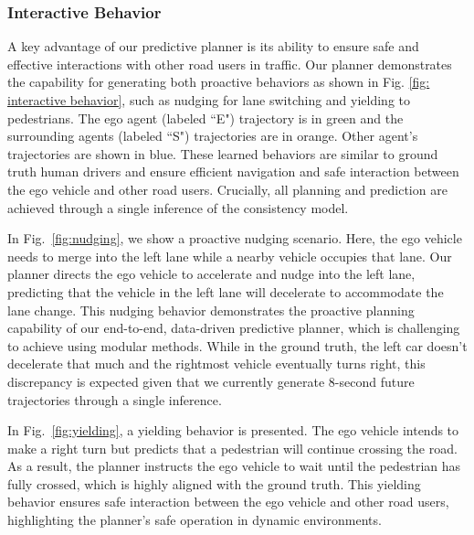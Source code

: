 \subsubsection{\textbf{Interactive Behavior}}

A key advantage of our predictive planner is its ability to ensure safe and effective interactions with other road users in traffic.
Our planner demonstrates the capability for generating both proactive behaviors as shown in Fig. \ref{fig: interactive behavior}, such as nudging for lane switching and yielding to pedestrians.
The ego agent (labeled ``E") trajectory is in green and the surrounding agents (labeled ``S") trajectories are in orange.
Other agent's trajectories are shown in blue.
These learned behaviors are similar to ground truth human drivers and ensure efficient navigation and safe interaction between the ego vehicle and other road users.
Crucially, all planning and prediction are achieved through a single inference of the consistency model.

In Fig.~\ref{fig:nudging}, we show a proactive nudging scenario. 
Here, the ego vehicle needs to merge into the left lane while a nearby vehicle occupies that lane. 
Our planner directs the ego vehicle to accelerate and nudge into the left lane, predicting that the vehicle in the left lane will decelerate to accommodate the lane change.
This nudging behavior demonstrates the proactive planning capability of our end-to-end, data-driven predictive planner, which is challenging to achieve using modular methods.
While in the ground truth, the left car doesn't decelerate that much and the rightmost vehicle eventually turns right, 
this discrepancy is expected given that we currently generate 8-second future trajectories through a single inference.

In Fig.~\ref{fig:yielding}, a yielding behavior is presented. 
The ego vehicle intends to make a right turn but predicts that a pedestrian will continue crossing the road.
As a result, the planner instructs the ego vehicle to wait until the pedestrian has fully crossed, which is highly aligned with the ground truth.
This yielding behavior ensures safe interaction between the ego vehicle and other road users, highlighting the planner's safe operation in dynamic environments.

